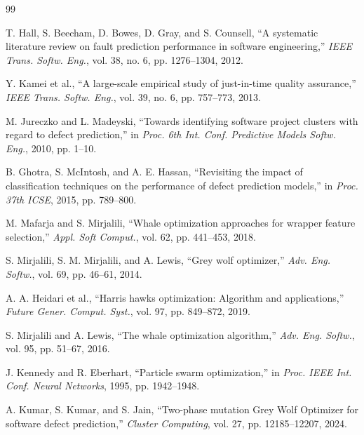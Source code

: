 \documentclass[conference,twocolumn]{IEEEtran}
\begin{document}

\begin{thebibliography}{99}

T. Hall, S. Beecham, D. Bowes, D. Gray, and S. Counsell, ``A systematic literature review on fault prediction performance in software engineering,'' \textit{IEEE Trans. Softw. Eng.}, vol. 38, no. 6, pp. 1276--1304, 2012.

Y. Kamei et al., ``A large-scale empirical study of just-in-time quality assurance,'' \textit{IEEE Trans. Softw. Eng.}, vol. 39, no. 6, pp. 757--773, 2013.

M. Jureczko and L. Madeyski, ``Towards identifying software project clusters with regard to defect prediction,'' in \textit{Proc. 6th Int. Conf. Predictive Models Softw. Eng.}, 2010, pp. 1--10.

B. Ghotra, S. McIntosh, and A. E. Hassan, ``Revisiting the impact of classification techniques on the performance of defect prediction models,'' in \textit{Proc. 37th ICSE}, 2015, pp. 789--800.

M. Mafarja and S. Mirjalili, ``Whale optimization approaches for wrapper feature selection,'' \textit{Appl. Soft Comput.}, vol. 62, pp. 441--453, 2018.

S. Mirjalili, S. M. Mirjalili, and A. Lewis, ``Grey wolf optimizer,'' \textit{Adv. Eng. Softw.}, vol. 69, pp. 46--61, 2014.

A. A. Heidari et al., ``Harris hawks optimization: Algorithm and applications,'' \textit{Future Gener. Comput. Syst.}, vol. 97, pp. 849--872, 2019.

S. Mirjalili and A. Lewis, ``The whale optimization algorithm,'' \textit{Adv. Eng. Softw.}, vol. 95, pp. 51--67, 2016.

J. Kennedy and R. Eberhart, ``Particle swarm optimization,'' in \textit{Proc. IEEE Int. Conf. Neural Networks}, 1995, pp. 1942--1948.

A. Kumar, S. Kumar, and S. Jain, ``Two-phase mutation Grey Wolf Optimizer for software defect prediction,'' \textit{Cluster Computing}, vol. 27, pp. 12185--12207, 2024.


\end{thebibliography}
\end{document}
